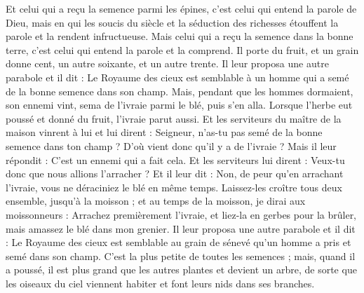 \begin{multicols}{2}
Et celui qui a reçu la semence parmi les épines, c'est celui qui entend la parole de Dieu, mais en qui les soucis du siècle et la séduction des richesses étouffent la parole et la rendent infructueuse.
Mais celui qui a reçu la semence dans la bonne terre, c'est celui qui entend la parole et la comprend. Il porte du fruit, et un grain donne cent, un autre soixante, et un autre trente.
Il leur proposa une autre parabole et il dit : Le Royaume des cieux est semblable à un homme qui a semé de la bonne semence dans son champ.
Mais, pendant que les hommes dormaient, son ennemi vint, sema de l'ivraie parmi le blé, puis s'en alla.
Lorsque l'herbe eut poussé et donné du fruit, l'ivraie parut aussi.
Et les serviteurs du maître de la maison vinrent à lui et lui dirent : Seigneur, n'as-tu pas semé de la bonne semence dans ton champ ? D'où vient donc qu'il y a de l'ivraie ?
Mais il leur répondit : C'est un ennemi qui a fait cela. Et les serviteurs lui dirent : Veux-tu donc que nous allions l'arracher ?
Et il leur dit : Non, de peur qu'en arrachant l'ivraie, vous ne déraciniez le blé en même temps.
Laissez-les croître tous deux ensemble, jusqu'à la moisson ; et au temps de la moisson, je dirai aux moissonneurs : Arrachez premièrement l'ivraie, et liez-la en gerbes pour la brûler, mais amassez le blé dans mon grenier.
Il leur proposa une autre parabole et il dit : Le Royaume des cieux est semblable au grain de sénevé qu'un homme a pris et semé dans son champ.
C'est la plus petite de toutes les semences ; mais, quand il a poussé, il est plus grand que les autres plantes et devient un arbre, de sorte que les oiseaux du ciel viennent habiter et font leurs nids dans ses branches.

\end{multicols}
